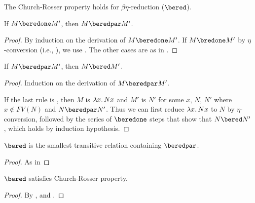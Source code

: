 \documentclass[../../../include/open-logic-section]{subfiles}
\begin{document}


The Church-Rosser property holds for
$\beta\eta$-reduction ($\bered$).

\begin{lem}
  If $M \beredone M'$, then $M \beredpar M'$.
\end{lem}

\begin{proof} 
  By induction on the derivation of $M \beredone M'$. If $M \bredone
  M'$ by $\eta$-conversion (i.e., ), we
  use . The other cases are as in
  .
\end{proof}


\begin{lem}
  If $M \beredpar M'$, then $M \bered M'$.
\end{lem}

\begin{proof} Induction on the derivation of $M \beredpar M'$.

  If the last rule is , then $M$ is
  $\lambd[x][Nx]$ and $M'$ is $N'$ for some $x$, $N$, $N'$ where $x
  \notin FV(N)$ and $N \beredpar N'$. Thus we can first reduce
  $\lambd[x][Nx]$ to $N$ by $\eta$-conversion, followed
  by the series of $\beredone$ steps that show that $N \bered N'$,
  which  holds by induction hypothesis.
\end{proof}


\begin{lem}
  $\bered$ is the smallest transitive relation containing $\beredpar$.
\end{lem}

\begin{proof}
  As in 
\end{proof}

\begin{thm}
  $\bered$ satisfies Church-Rosser property.
\end{thm}

\begin{proof}
  By ,  and .
\end{proof}
\end{document}
